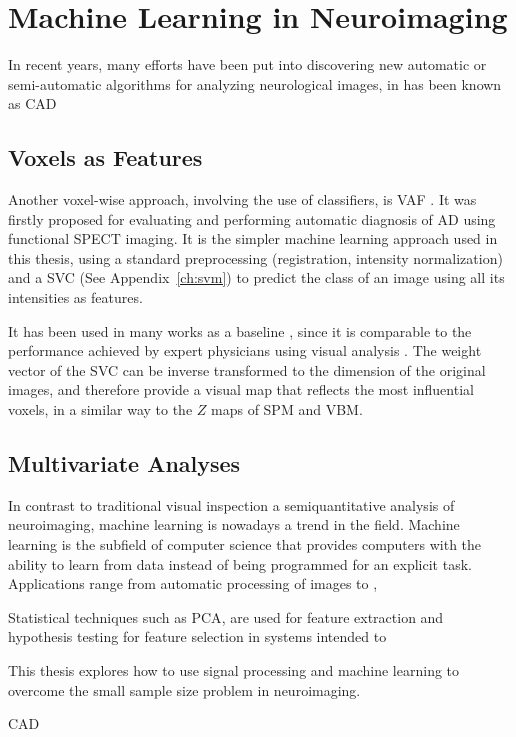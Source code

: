 \section{Machine Learning in Neuroimaging}\label{sec:machinelearning}
In recent years, many efforts have been put into discovering new automatic or semi-automatic algorithms for analyzing neurological images, in has been known as \acf{CAD}


\subsection{Voxels as Features}
Another voxel-wise approach, involving the use of classifiers, is \acf{VAF} \cite{Stoeckel04}. It was firstly proposed for evaluating and performing automatic diagnosis of \ac{AD} using functional \ac{SPECT} imaging. It is the simpler machine learning approach used in this thesis, using a standard preprocessing (registration, intensity normalization) and a \ac{SVC} (See Appendix~\ref{ch:svm}) to predict the class of an image using all its intensities as features. 

It has been used in many works as a baseline \cite{Salas-Gonzalez2009}, since it is comparable to the performance achieved by expert physicians using visual analysis \cite{Stoeckel04}. The weight vector of the \ac{SVC} can be inverse transformed to the dimension of the original images, and therefore provide a visual map that reflects the most influential voxels, in a similar way to the $Z$ maps of \ac{SPM} and \ac{VBM}. 

\subsection{Multivariate Analyses}
In contrast to traditional visual inspection a semiquantitative analysis of neuroimaging, machine learning is nowadays a trend in the field. Machine learning is the subfield of computer science that provides computers with the ability to learn from data instead of being programmed for an explicit task. Applications range from automatic processing of images to , 

Statistical techniques such as \ac{PCA}, are used for feature extraction and hypothesis testing for feature selection in systems intended to 

This thesis explores how to use signal processing and machine learning to overcome the small sample size problem in neuroimaging. 

\ac{CAD}

